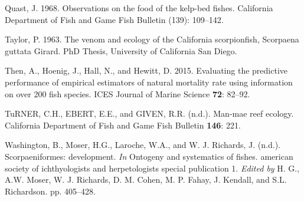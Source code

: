 \documentclass[12pt,]{article}
\begin{document}
\hypertarget{ref-Quast1968}{}
Quast, J. 1968. Observations on the food of the kelp-bed fishes.
California Department of Fish and Game Fish Bulletin (139): 109--142.

\hypertarget{ref-Taylor1963}{}
Taylor, P. 1963. The venom and ecology of the California scorpionfish,
Scorpaena guttata Girard. PhD Thesis, University of California San
Diego.

\hypertarget{ref-Then2015}{}
Then, A., Hoenig, J., Hall, N., and Hewitt, D. 2015. Evaluating the
predictive performance of empirical estimators of natural mortality rate
using information on over 200 fish species. ICES Journal of Marine
Science \textbf{72}: 82--92.

\hypertarget{ref-Turner1969}{}
TuRNER, C.H., EBERT, E.E., and GIVEN, R.R. (n.d.). Man-mae reef ecology.
California Department of Fish and Game Fish Bulletin \textbf{146}: 221.

\hypertarget{ref-Washington1984}{}
Washington, B., Moser, H.G., Laroche, W.A., and W. J. Richards, J.
(n.d.). Scorpaeniformes: development. \emph{In} Ontogeny and systematics
of fishes. american society of ichthyologists and herpetologists special
publication 1. \emph{Edited by} H. G., A.W. Moser, W. J. Richards, D. M.
Cohen, M. P. Fahay, J. Kendall, and S.L. Richardson. pp. 405--428.
\end{document}
